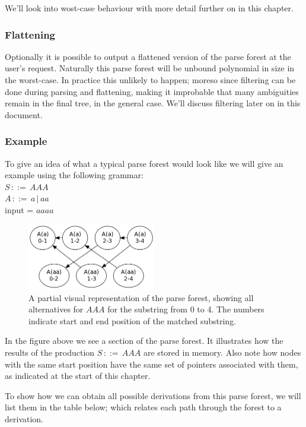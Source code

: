 \documentclass[a4paper,10pt]{article}
\begin{document}
We'll look into wost-case behaviour with more detail further on in this chapter.

\subsubsection{Flattening}
Optionally it is possible to output a flattened version of the parse forest at the user's request. Naturally this parse forest will be unbound polynomial in size in the worst-case. In practice this unlikely to happen; moreso since filtering can be done during parsing and flattening, making it improbable that many ambiguities remain in the final tree, in the general case. We'll discuss filtering later on in this document.

\subsubsection{Example}
To give an idea of what a typical parse forest would look like we will give an example using the following grammar:\\
$S\,::=\,AAA$\\
$A\,::=\,a\,|\,aa$\\
input = $aaaa$

\begin{figure}[H]
\centering
\includegraphics[width=0.5\textwidth]{a_aa-forest.png}
\caption{A partial visual representation of the parse forest, showing all alternatives for $AAA$ for the substring from 0 to 4. The numbers indicate start and end position of the matched substring.}
\end{figure}

In the figure above we see a section of the parse forest. It illustrates how the results of the production $S\,::=\,AAA$ are stored in memory. Also note how nodes with the same start position have the same set of pointers associated with them, as indicated at the start of this chapter.

To show how we can obtain all possible derivations from this parse forest, we will list them in the table below; which relates each path through the forest to a derivation.
\end{document}

